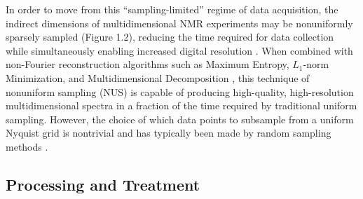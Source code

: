 \begin{doublespace}
In order to move from this ``sampling-limited'' regime of data acquisition,
the indirect dimensions of multidimensional NMR experiments may be nonuniformly
sparsely sampled (Figure 1.2), reducing the time required for data collection
while simultaneously enabling increased digital resolution
\cite{rovnyak:jmr2004}. When combined with non-Fourier reconstruction
algorithms such as Maximum Entropy, $L_1$-norm Minimization, and
Multidimensional Decomposition \cite{mobli:pnmrs2014}, this technique
of nonuniform sampling (NUS) is capable of producing high-quality,
high-resolution multidimensional spectra in a fraction of the time
required by traditional uniform sampling. However, the choice of which data
points to subsample from a uniform Nyquist grid is nontrivial and has typically
been made by random sampling methods
\cite{hoch:jmr2008,maciejewski:jmr2009}.
\end{doublespace}

\subsection{Processing and Treatment}

